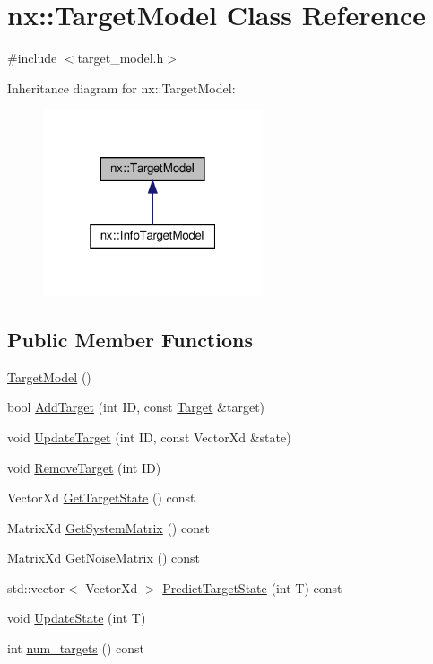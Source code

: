 \hypertarget{classnx_1_1TargetModel}{}\section{nx\+:\+:Target\+Model Class Reference}
\label{classnx_1_1TargetModel}


{\ttfamily \#include $<$target\+\_\+model.\+h$>$}



Inheritance diagram for nx\+:\+:Target\+Model\+:
\nopagebreak
\begin{figure}[H]
\begin{center}
\leavevmode
\includegraphics[width=184pt]{classnx_1_1TargetModel__inherit__graph}
\end{center}
\end{figure}
\subsection*{Public Member Functions}
\begin{DoxyCompactItemize}
\item 
\hyperlink{classnx_1_1TargetModel_ad6df134361a815092dde948c923fee87}{Target\+Model} ()
\item 
bool \hyperlink{classnx_1_1TargetModel_ab38b91d30509a7e981c456d74eecb07c}{Add\+Target} (int ID, const \hyperlink{structnx_1_1Target}{Target} \&target)
\item 
void \hyperlink{classnx_1_1TargetModel_a460f91497d1eb6808543b0bbc26ddd61}{Update\+Target} (int ID, const Vector\+Xd \&state)
\item 
void \hyperlink{classnx_1_1TargetModel_ad89e37efd10097f7c2d97f79ab380919}{Remove\+Target} (int ID)
\item 
Vector\+Xd \hyperlink{classnx_1_1TargetModel_afbdd3abdce59717ddfa16b70808178ca}{Get\+Target\+State} () const
\item 
Matrix\+Xd \hyperlink{classnx_1_1TargetModel_a1ee2990a96918171f0f779afed6d9f53}{Get\+System\+Matrix} () const
\item 
Matrix\+Xd \hyperlink{classnx_1_1TargetModel_a8b4c0bf53662bfedb955754f8debc674}{Get\+Noise\+Matrix} () const
\item 
std\+::vector$<$ Vector\+Xd $>$ \hyperlink{classnx_1_1TargetModel_a106254c8b6d05f241ab029ed7f534ea9}{Predict\+Target\+State} (int T) const
\item 
void \hyperlink{classnx_1_1TargetModel_ab170163096edacbfc2fc4e697f9cf139}{Update\+State} (int T)
\item 
int \hyperlink{classnx_1_1TargetModel_a269a926fe7a0fc4eae2416f4f0837f94}{num\+\_\+targets} () const
\end{DoxyCompactItemize}
